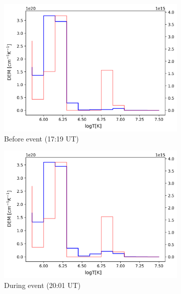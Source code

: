 \begin{figure}[h!]

    \begin{subfigure}[b]{0.3\textwidth}
        \centering
        \includegraphics[width=\textwidth]{images/dem_profile_before_event_2012_aug_31.png}
        \caption{Before event (17:19 UT)}
    \end{subfigure}
    \hfill
    \begin{subfigure}[b]{0.3\textwidth}
        \centering
        \includegraphics[width=\textwidth]{images/dem_profile_during_event_2012_aug_31.png}
        \caption{During event (20:01 UT)}
    \end{subfigure}
    \hfill
    \begin{subfigure}[b]{0.3\textwidth}

\end{subfigure}
\end{figure}
